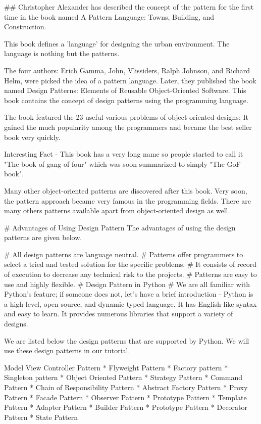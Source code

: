 ## Christopher Alexander
 has described the concept of the pattern for the first time in the book named A Pattern Language: Towns, Building, and Construction.


 This book defines a 'language' for designing the urban environment. The language is nothing but the patterns.

The four authors: Erich Gamma, John, Vlissiders, Ralph Johnson, and Richard Helm, were picked the idea of a pattern language. Later, they published the book named Design Patterns: Elements of Reusable Object-Oriented Software. This book contains the concept of design patterns using the programming language.

The book featured the 23 useful various problems of object-oriented designs; It gained the much popularity among the programmers and became the best seller book very quickly.

Interesting Fact - This book has a very long name so people started to call it "The book of gang of four" which was soon summarized to simply "The GoF book".

Many other object-oriented patterns are discovered after this book. Very soon, the pattern approach became very famous in the programming fields. There are many others patterns available apart from object-oriented design as well.


# Advantages of Using Design Pattern
The advantages of using the design patterns are given below.

 # All design patterns are language neutral.
 # Patterns offer programmers to select a tried and tested solution for the specific problems.
# It consists of record of execution to decrease any technical risk to the projects.
# Patterns are easy to use and highly flexible.
# Design Pattern in Python
# We are all familiar with Python's feature; if someone does not, let's have a brief introduction - Python is a high-level, open-source, and dynamic typed language. It has English-like syntax and easy to learn. It provides numerous libraries that support a variety of designs.


We are listed below the design patterns that are supported by Python. We will use these design patterns in our tutorial.

Model View Controller Pattern
* Flyweight Pattern
*   Factory pattern
*   Singleton pattern
*   Object Oriented Pattern
*   Strategy Pattern
*   Command Pattern
*   Chain of Responsibility Pattern
*   Abstract Factory Pattern
*   Proxy Pattern
*   Facade Pattern
*   Observer Pattern
*   Prototype Pattern
*   Template Pattern
*   Adapter Pattern
*   Builder Pattern
*   Prototype Pattern
*   Decorator Pattern
*   State Pattern



